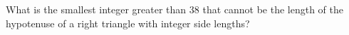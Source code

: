 What is the smallest integer greater than $38$ that cannot be the length of the hypotenuse of a right triangle with integer side lengths?
